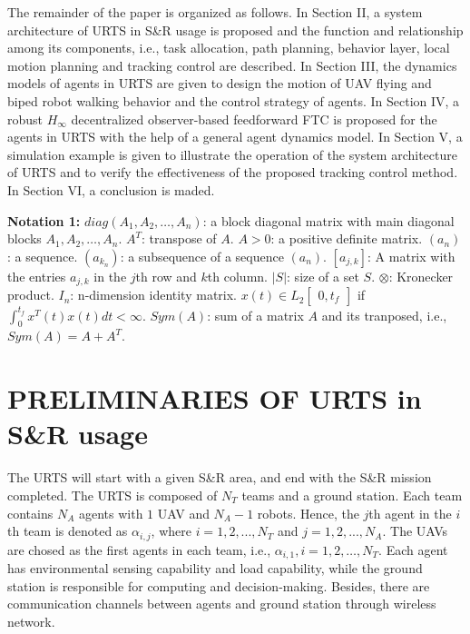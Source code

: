 \documentclass{ieeeaccess}
\begin{document}
The remainder of the paper is organized as follows. In Section II, a system architecture of URTS in S\&R usage is proposed and the function and relationship among its components, i.e., task allocation, path planning, behavior layer, local motion planning and tracking control are described. In Section III, the dynamics models of agents in URTS are given to design the motion of UAV flying and biped robot walking behavior and the control strategy of agents. In Section IV, a robust $H_\infty$ decentralized observer-based feedforward FTC is proposed for the agents in URTS with the help of a general agent dynamics model. In Section V, a simulation example is given to illustrate the operation of the system architecture of URTS and to verify the effectiveness of the proposed tracking control method. In Section VI, a conclusion is maded.

\textbf{Notation 1:} 
$diag(A_1, A_2, \dots, A_n)$: a block diagonal matrix with main diagonal blocks $A_1, A_2, \dots, A_n$. $A^T$: transpose of $A$. $A > 0$: a positive definite matrix. $(a_n)$: a sequence. $(a_{k_n})$: a subsequence of a sequence $(a_n)$. $[a_{j,k}]$: A matrix with the entries $a_{j,k}$ in the $j$th row and $k$th column. $\vert{S}\vert$: size of a set $S$. $\otimes$: Kronecker product. $I_n$: n-dimension identity matrix. $x(t)\in L_2\begin{bmatrix}
    0,t_f 
\end{bmatrix}$ if $\int^{t_f}_{0}x^T(t)x(t)dt<\infty$. $Sym(A)$: sum of a matrix $A$ and its tranposed, i.e., $Sym(A) = A+A^T$.

\section{PRELIMINARIES OF URTS in S\&R usage}
The URTS will start with a given S\&R area, and end with the S\&R mission completed. The URTS is composed of $N_T$ teams and a ground station. Each team contains $N_A$ agents with $1$ UAV and $N_A-1$ robots. Hence, the $j$th agent in the $i$th team is denoted as $\alpha_{i,j}$, where $i=1,2,...,N_T$ and $j=1,2,...,N_A$. The UAVs are chosed as the first agents in each team, i.e., $\alpha_{i,1},i=1,2,\dots,N_T$. Each agent has environmental sensing capability and load capability, while the ground station is responsible for computing and decision-making. Besides, there are communication channels between agents and ground station through wireless network.
\end{document}
